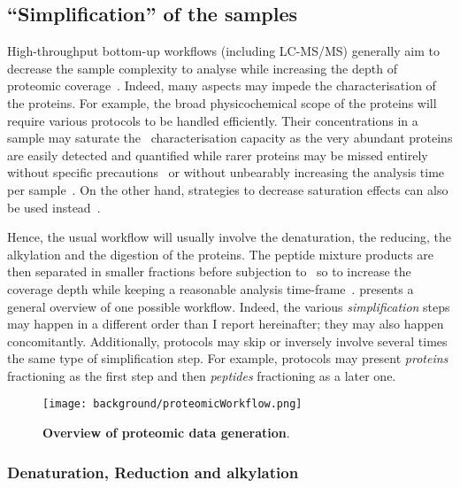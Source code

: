 \subsection{\enquote{Simplification} of the samples}\label{subsec:simpleProt}

High-throughput bottom-up workflows (including \gls{LC-MS/MS}) generally
aim to decrease the sample complexity to analyse while increasing the depth
of proteomic coverage~. Indeed,
many aspects may impede the characterisation of the proteins.
For example, the broad physicochemical scope of the proteins will
require various protocols to be handled efficiently.
Their concentrations in a sample may saturate the \ms\ characterisation capacity
as the very abundant proteins are easily detected and quantified while rarer
proteins may be missed entirely without specific precautions~ or without unbearably increasing the
analysis time per sample~.
On the other hand, strategies to decrease saturation effects can also be used
instead~.\mybr\

Hence, the usual workflow will usually involve the denaturation, the reducing,
the alkylation and the digestion of the proteins. The peptide mixture products
are then separated in smaller fractions before subjection to \ms\ so to increase
the coverage depth
while keeping a reasonable analysis time-frame~.
 presents a general overview of one possible workflow.
Indeed, the various \emph{simplification} steps may happen in a different order
than I report hereinafter; they may also happen concomitantly. Additionally,
protocols may skip or inversely involve several times the same type of
simplification step. For example, protocols may present
\emph{proteins} fractioning as the first step
and then \emph{peptides} fractioning as a later one.\mybr\

\begin{figure}[!htb]
    \texttt{[image: background/proteomicWorkflow.png]}\centering
    \caption[Overview of proteomic data generation]{\label{fig:proteomics}%
    \textbf{Overview of proteomic data generation}.}
\end{figure}

\subsubsection{Denaturation, Reduction and alkylation}

